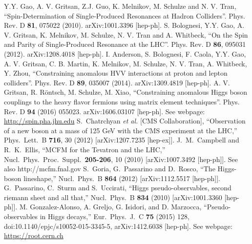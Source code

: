 \documentclass[aps,superscriptaddress,nofootinbib]{revtex4}
\begin{document}
\begin{thebibliography}{99}
Y.Y. Gao, A. V. Gritsan, Z.J. Guo, K. Melnikov, M. Schulze and N. V. Tran, ``Spin-Determination of Single-Produced Resonances at Hadron Colliders''. Phys. Rev. D \textbf{81}, 075022 (2010). arXiv:1001.3396 [hep-ph].
S. Bolognesi, Y.Y. Gao, A. V. Gritsan, K. Melnikov, M. Schulze, N. V. Tran and A. Whitbeck, ``On the Spin and Parity of Single-Produced Resonance at the LHC''. Phys. Rev. D \textbf{86}, 095031 (2012). arXiv:1208.4018 [hep-ph].
I. Anderson, S. Bolognesi, F. Caola, Y.Y. Gao, A. V. Gritsan, C. B. Martin, K. Melnikov, M. Schulze, N. V. Tran, A. Whitbeck, Y. Zhou, ``Constraining anomalous HVV interactions at proton and lepton colliders''. Phys. Rev. D \textbf{89}, 035007 (2014). arXiv:1309.4819 [hep-ph].
A. V. Gritsan, R. R\"ontsch, M. Schulze, M. Xiao, ``Constraining anomalous Higgs boson couplings to the heavy flavor fermions using matrix element techniques''. Phys. Rev. D \textbf{94} (2016) 055023. arXiv:1606.03107 [hep-ph].
See webpage: \url{http://spin.pha.jhu.edu}
  S.~Chatrchyan {\it et al.}  [CMS Collaboration],
  ``Observation of a new boson at a mass of 125 GeV with the CMS experiment at the LHC,''
  Phys.\ Lett.\ B {\bf 716}, 30 (2012)
  [arXiv:1207.7235 [hep-ex]].
  J.~M.~Campbell and R.~K.~Ellis,
  ``MCFM for the Tevatron and the LHC,''
  Nucl.\ Phys.\ Proc.\ Suppl.\  {\bf 205-206}, 10 (2010)
  [arXiv:1007.3492 [hep-ph]].
  See also http://mcfm.fnal.gov
  S.~Goria, G.~Passarino and D.~Rosco,
  ``The Higgs-boson lineshape,''
  Nucl.\ Phys.\ B  {\bf 864} (2012)
  [arXiv:1112.5517 [hep-ph]].
  G.~Passarino, C.~Sturm and S.~Uccirati,
  ``Higgs pseudo-observables, second riemann sheet and all that,''
  Nucl.\ Phys.\ B {\bf 834} (2010)
  [arXiv:1001.3360 [hep-ph]].
  M. Gonzalez-Alonso, A. Greljo, G. Isidori, and D. Marzocca, ``Pseudo-observables in
  Higgs decays,'' Eur.\ Phys.\ J.\ C {\bf 75} (2015) 128,
  doi:10.1140/epjc/s10052-015-3345-5, arXiv:1412.6038 [hep-ph].
See webpage: \url{https://root.cern.ch}

\end{thebibliography}
\end{document}
